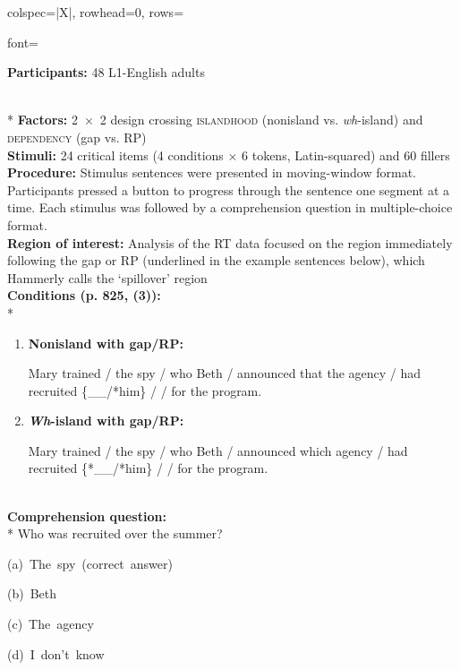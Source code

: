 \begin{longtblr}[caption={\textcite{hammerly2022}: Self-paced reading task}, label={tblr:hammerly}]{colspec={|X|}, rowhead=0, rows={font=\raggedright{}}}\hline
\textbf{Participants:} 48 L1-English adults \vspace{5pt}\rule{0pt}{10pt}\\*
\textbf{Factors:} 2~×~2 design crossing \textsc{islandhood} (nonisland vs. \textit{wh}-island) and \textsc{dependency} (gap vs. RP) \vspace{5pt}\\
\textbf{Stimuli:} 24 critical items (4 conditions × 6 tokens, Latin-squared) and 60 fillers \vspace{5pt}\\
\textbf{Procedure:} Stimulus sentences were presented in moving-window format. Participants pressed a button to progress through the sentence one segment at a time. Each stimulus was followed by a comprehension question in multiple-choice format. \vspace{5pt}\\
\textbf{Region of interest:} Analysis of the RT data focused on the region immediately following the gap or RP (underlined in the example sentences below), which Hammerly calls the `spillover' region \vspace{5pt}\\
\textbf{Conditions (p. 825, (3)):} \vspace{5pt}\\*
\begin{varwidth}{\linewidth}\begin{enumerate}[\bfseries (a),itemsep=5pt] 
\item \textbf{Nonisland with gap/RP:}\par\nobreak
Mary trained / the spy / who Beth / announced that the agency / had recruited \{\_\_/*him\} /  / for the program.
\item \textbf{\textit{Wh}-island with gap/RP:}\par\nobreak
Mary trained / the spy / who Beth / announced which agency / had recruited \{*\_\_/*him\} /  / for the program.
\end{enumerate}\end{varwidth}\vspace{5pt}\\
\textbf{Comprehension question:} \vspace{5pt}\\*
\setlength{\leftskip}{5pt}Who was recruited over the summer?
\par\nobreak
(a)~The~spy~(correct~answer)\par\nobreak 
(b)~Beth\par\nobreak 
(c)~The~agency\par\nobreak 
(d)~I~don't~know
\\\hline
\end{longtblr}


